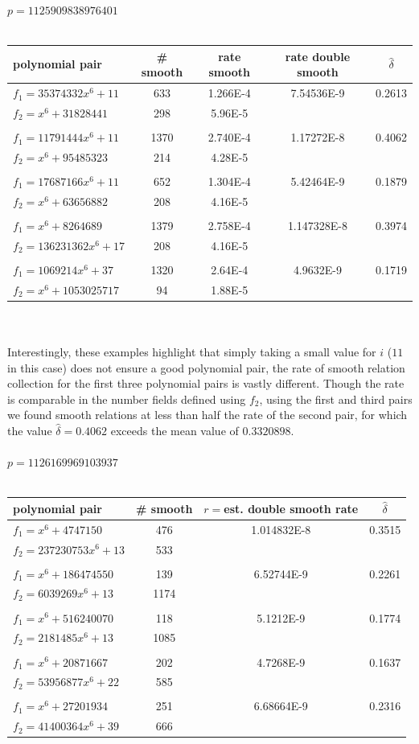 \documentclass[a4paper, 12pt, envcountsect, runningheads]{llncs}
\numberwithin{figure}{section}
\numberwithin{equation}{section}
\begin{document}
\noindent$p=1125909838976401$\\\\
\begin{tabular}{l|cccc}
polynomial pair & \# smooth & rate smooth & rate double smooth & $\hat{\delta}$\\
\hline
$f_1=35374332x^6+11$ &633&1.266E-4&7.54536E-9&0.2613\\
$f_2=x^6+31828441$ &298&5.96E-5&&\\
&&&&\\
$f_1=11791444x^6+11$ &1370&2.740E-4&1.17272E-8&0.4062\\
$f_2=x^6+95485323$ &214&4.28E-5&&\\
&&&&\\
$f_1=17687166x^6+11$ &652&1.304E-4&5.42464E-9&0.1879\\
$f_2=x^6+63656882$ &208&4.16E-5&&\\
&&&&\\
$f_1=x^6+8264689$ &1379&2.758E-4&1.147328E-8&0.3974\\
$f_2=136231362x^6+17$ &208&4.16E-5&&\\
&&&&\\
$f_1=1069214x^6+37$ &1320&2.64E-4&4.9632E-9&0.1719\\
$f_2=x^6+1053025717$ &94&1.88E-5&&
\end{tabular}\\\\
Interestingly, these examples highlight that simply taking a small value for $i$ ($11$ in this case) does not ensure a good polynomial pair, the rate of smooth relation collection for the first three polynomial pairs is vastly different. Though the rate is comparable in the number fields defined using $f_2$, using the first and third pairs we found smooth relations at less than half the rate of the second pair, for which the value $\hat{\delta}=0.4062$ exceeds the mean value of $0.3320898$.\\\\
$p=1126169969103937$\\\\
\begin{tabular}{l|ccc}
polynomial pair & \# smooth & $r=$est. double smooth rate & $\hat{\delta}$\\
\hline
$f_1=x^6+4747150$ &476&1.014832E-8&0.3515\\
$f_2=237230753x^6+13$ &533&&\\
&&&\\
$f_1=x^6+186474550$ &139&6.52744E-9&0.2261\\
$f_2=6039269x^6+13$ &1174&&\\
&&&\\
$f_1=x^6+516240070$ &118&5.1212E-9&0.1774\\
$f_2=2181485x^6+13$ &1085&&\\
&&&\\
$f_1=x^6+20871667$ &202&4.7268E-9&0.1637\\
$f_2=53956877x^6+22$ &585&&\\
&&&\\
$f_1=x^6+27201934$ &251&6.68664E-9&0.2316\\
$f_2=41400364x^6+39$ &666&&\\
\end{tabular}
\end{document}
